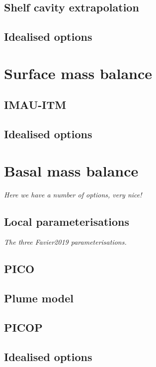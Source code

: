 \documentclass{article}
\begin{document}
\subsection{Shelf cavity extrapolation}

\subsection{Idealised options}

\newpage
\section{Surface mass balance}

\subsection{IMAU-ITM}

\subsection{Idealised options}

\newpage
\section{Basal mass balance}

\textit{Here we have a number of options, very nice!}

\subsection{Local parameterisations}

\textit{The three Favier2019 parameterisations.}

\subsection{PICO}

\subsection{Plume model}

\subsection{PICOP}

\subsection{Idealised options}
\end{document}
